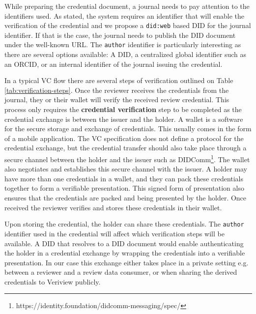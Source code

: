 While preparing the credential document, a journal needs to pay attention to the identifiers used. As stated, the system requires an identifier that will enable the verification of the credential and we propose a \lstinline{did:web} based \acrshort{DID} for the journal identifier. If that is the case, the journal needs to publish the \acrshort{DID} document under the well-known \acrshort{URL}. The \lstinline{author} identifier is particularly interesting as there are several options available: A \acrfull{DID}, a centralized global identifier such as an \acrshort{ORCID}, or an internal identifier of the journal issuing the credential.

In a typical \acrshort{VC} flow there are several steps of verification outlined on Table \ref{tab:verification-steps}. Once the reviewer receives the credentials from the journal, they or their wallet will verify the received review credential. This process only requires the \textbf{credential verification} step to be completed as the credential exchange is between the issuer and the holder. A wallet is a software for the secure storage and exchange of credentials. This usually comes in the form of a mobile application. The VC specification does not define a protocol for the credential exchange, but the credential transfer should also take place through a secure channel between the holder and the issuer such as DIDComm\footnote{https://identity.foundation/didcomm-messaging/spec/}. The wallet also negotiates and establishes this secure channel with the issuer. A holder may have more than one credentials in a wallet, and they can pack these credentials together to form a verifiable presentation. This signed form of presentation also ensures that the credentials are packed and being presented by the holder. Once received the reviewer verifies and stores these credentials in their wallet. 





Upon storing the credential, the holder can share these credentials. The \lstinline{author} identifier used in the credential will affect which verification steps will be available. A \acrshort{DID} that resolves to a \acrshort{DID} document would enable authenticating the holder in a credential exchange by wrapping the credentials into a verifiable presentation. In our case this exchange either takes place in a private setting e.g. between a reviewer and a review data consumer, or when sharing the derived credentials to Veriview publicly. 



